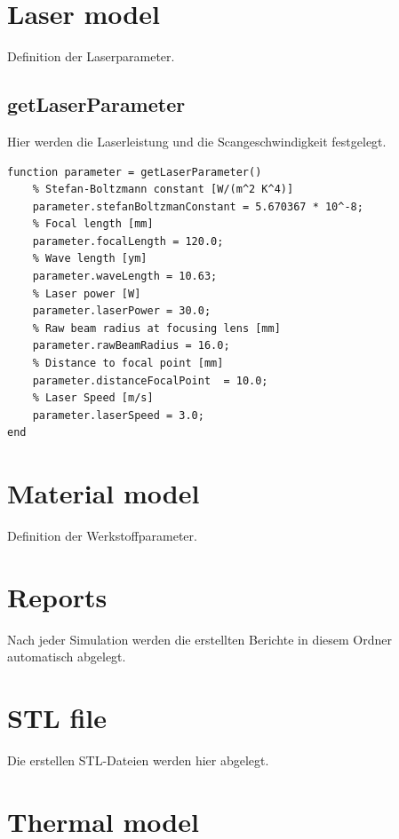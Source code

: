 \documentclass{scrartcl}
\begin{document}
\section{Laser model}\label{sec:laserModel}

Definition der Laserparameter.

\subsection{getLaserParameter}\label{subsec:getLaserParameter}

Hier werden die Laserleistung und die Scangeschwindigkeit festgelegt.

\begin{lstlisting}
function parameter = getLaserParameter()
    % Stefan-Boltzmann constant [W/(m^2 K^4)]
    parameter.stefanBoltzmanConstant = 5.670367 * 10^-8;
    % Focal length [mm]
    parameter.focalLength = 120.0;
    % Wave length [ym]
    parameter.waveLength = 10.63;
    % Laser power [W]
    parameter.laserPower = 30.0;
    % Raw beam radius at focusing lens [mm] 
    parameter.rawBeamRadius = 16.0;
    % Distance to focal point [mm]
    parameter.distanceFocalPoint  = 10.0;
    % Laser Speed [m/s]
    parameter.laserSpeed = 3.0;
end
\end{lstlisting}

\section{Material model}\label{sec:materialModel}

Definition der Werkstoffparameter.

\section{Reports}\label{sec:reports}

Nach jeder Simulation werden die erstellten Berichte in diesem Ordner automatisch abgelegt.

\section{STL file}\label{sec:stlFile}

Die erstellen STL-Dateien werden hier abgelegt.

\section{Thermal model}\label{sec:thermalModel}
\end{document}
